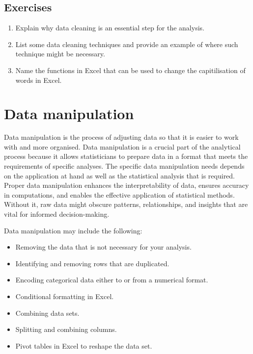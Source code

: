 \documentclass[
]{book}
\begin{document}
\section*{Exercises}\label{exercises}

\begin{enumerate}
\def\labelenumi{\arabic{enumi}.}
\item
  Explain why data cleaning is an essential step for the analysis.
\item
  List some data cleaning techniques and provide an example of where such technique might be necessary.
\item
  Name the functions in Excel that can be used to change the capitilisation of words in Excel.
\end{enumerate}

\chapter{Data manipulation}\label{data-manipulation}

Data manipulation is the process of adjusting data so that it is easier to work with and more organised. Data manipulation is a crucial part of the analytical process because it allows statisticians to prepare data in a format that meets the requirements of specific analyses. The specific data manipulation needs depends on the application at hand as well as the statistical analysis that is required. Proper data manipulation enhances the interpretability of data, ensures accuracy in computations, and enables the effective application of statistical methods. Without it, raw data might obscure patterns, relationships, and insights that are vital for informed decision-making.

Data manipulation may include the following:

\begin{itemize}
\item
  Removing the data that is not necessary for your analysis.
\item
  Identifying and removing rows that are duplicated.
\item
  Encoding categorical data either to or from a numerical format.
\item
  Conditional formatting in Excel.
\item
  Combining data sets.
\item
  Splitting and combining columns.
\item
  Pivot tables in Excel to reshape the data set.
\end{itemize}
\end{document}
